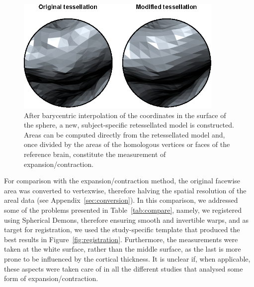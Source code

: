 \begin{figure}[!tbp]  %
\centering
\includegraphics[width=10cm]{images/retessellate.eps}
\caption[Example of a retessellated surface.]{After barycentric interpolation of the coordinates in the surface of the sphere, a new, subject-specific retessellated model is constructed. Areas can be computed directly from the retessellated model and, once divided by the areas of the homologous vertices or faces of the reference brain, constitute the measurement of expansion/contraction.}
\label{fig:retessellate}
\end{figure}

For comparison with the expansion/contraction method, the original facewise area was converted to vertexwise, therefore halving the spatial resolution of the areal data (see Appendix~\ref{sec:conversion}). In this comparison, we addressed some of the problems presented in Table~\ref{tab:compare}, namely, we registered using Spherical Demons, therefore ensuring smooth and invertible warps, and as target for registration, we used the study-specific template that produced the best results in Figure~\ref{fig:registration}. Furthermore, the measurements were taken at the white surface, rather than the middle surface, as the last is more prone to be influenced by the cortical thickness. It is unclear if, when applicable, these aspects were taken care of in all the different studies that analysed some form of expansion/contraction.

